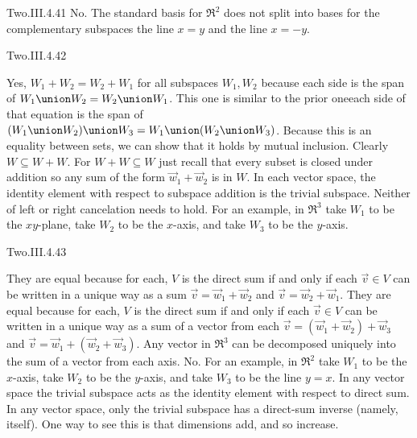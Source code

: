 \begin{ans}{Two.III.4.41}
      No.
      The standard basis for \( \Re^2 \) does not split into bases for
      the complementary subspaces the line \( x=y \) and the line
      \( x=-y \).
    
\end{ans}
\begin{ans}{Two.III.4.42}
      \begin{exparts}
        \partsitem  Yes, \( W_1+W_2=W_2+W_1 \) for all subspaces \( W_1,W_2 \)
          because each side is the span of \( W_1\union W_2=W_2\union W_1 \).
        \partsitem This one is similar to the prior one\Dash each side
          of that equation is the span of
          \( (W_1\union W_2)\union W_3=W_1\union (W_2\union W_3) \).
        \partsitem Because this is an equality between sets, we can show that
          it holds by mutual inclusion.
          Clearly \( W\subseteq W+W \).
          For \( W+W\subseteq W \) just recall that every subset is closed
          under addition so any sum of the form \( \vec{w}_1+\vec{w}_2 \) is in
          \( W \).
        \partsitem In each vector space, the identity element with respect
          to subspace addition is the trivial subspace.
        \partsitem   Neither of left or right cancelation needs to hold.
          For an example, in \( \Re^3 \) take \( W_1 \) to be the
          \( xy \)-plane, take \( W_2 \) to be the \( x \)-axis,
          and take \( W_3 \) to be the \( y \)-axis.
      \end{exparts}
     
\end{ans}
\begin{ans}{Two.III.4.43}
      \begin{exparts}
         \partsitem They are equal because for each,
           \( V \) is the direct sum if
           and only if each \( \vec{v}\in V \) can be written in a unique
           way as a sum \( \vec{v}=\vec{w}_1+\vec{w}_2 \) and
           \( \vec{v}=\vec{w}_2+\vec{w}_1 \).
         \partsitem They are equal because for each,
           \( V \) is the direct sum if
           and only if each \( \vec{v}\in V \) can be written in a unique
           way as a sum of a vector from each
           $\vec{v}=(\vec{w}_1+\vec{w}_2)+\vec{w}_3$
           and $\vec{v}=\vec{w}_1+(\vec{w}_2+\vec{w}_3)$.
         \partsitem Any vector in \( \Re^3 \) can be decomposed uniquely into
           the sum of a vector from each axis.
         \partsitem No.
           For an example, in \( \Re^2 \) take \( W_1 \) to be the
           \( x \)-axis, take \( W_2 \) to be the \( y \)-axis, and
           take \( W_3 \) to be the line \( y=x \).
         \partsitem In any vector space the trivial subspace acts as
           the identity element with respect to direct sum.
         \partsitem In any vector space, only the trivial subspace has
           a direct-sum inverse (namely, itself).
           One way to see this is that dimensions add, and so increase.
      \end{exparts}
     
\end{ans}
